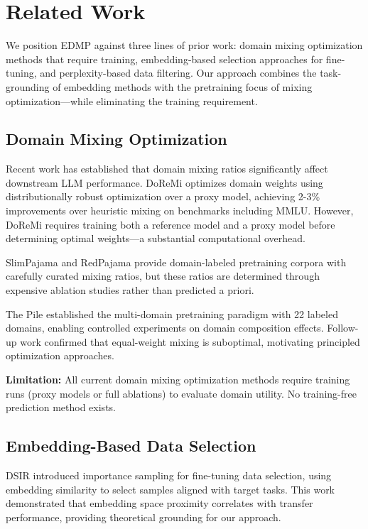 \section{Related Work}
\label{sec:related}

We position EDMP against three lines of prior work: domain mixing optimization methods that require training, embedding-based selection approaches for fine-tuning, and perplexity-based data filtering. Our approach combines the task-grounding of embedding methods with the pretraining focus of mixing optimization---while eliminating the training requirement.

\subsection{Domain Mixing Optimization}

Recent work has established that domain mixing ratios significantly affect downstream LLM performance. DoReMi \citep{xie2023doremi} optimizes domain weights using distributionally robust optimization over a proxy model, achieving 2-3\% improvements over heuristic mixing on benchmarks including MMLU. However, DoReMi requires training both a reference model and a proxy model before determining optimal weights---a substantial computational overhead.

SlimPajama \citep{soboleva2023slimpajama} and RedPajama \citep{together2023redpajama} provide domain-labeled pretraining corpora with carefully curated mixing ratios, but these ratios are determined through expensive ablation studies rather than predicted a priori.

The Pile \citep{gao2020pile} established the multi-domain pretraining paradigm with 22 labeled domains, enabling controlled experiments on domain composition effects. Follow-up work confirmed that equal-weight mixing is suboptimal, motivating principled optimization approaches.

\textbf{Limitation:} All current domain mixing optimization methods require training runs (proxy models or full ablations) to evaluate domain utility. No training-free prediction method exists.

\subsection{Embedding-Based Data Selection}

DSIR \citep{xie2023dsir} introduced importance sampling for fine-tuning data selection, using embedding similarity to select samples aligned with target tasks. This work demonstrated that embedding space proximity correlates with transfer performance, providing theoretical grounding for our approach.


